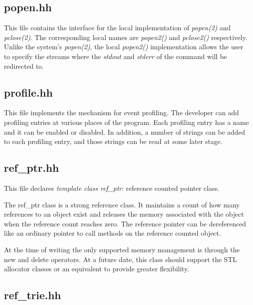 \documentclass[11pt]{article}
\begin{document}
\subsection{popen.hh}

This file contains the interface for the local implementation
of \emph{popen(2)} and \emph{pclose(2)}.
The corresponding local names are \emph{popen2()} and \emph{pclose2()}
respectively. Unlike the system's \emph{popen(2)}, the local
\emph{popen2()} implementation allows the user to specify the streams
where the \emph{stdout} and \emph{stderr} of the command will be
redirected to.

\subsection{profile.hh}

This file implements the mechanism for event profiling.
The developer can add profiling entries at various places of the program.
Each profiling entry has a name and it can be enabled or disabled.
In addition, a number of strings can be added to each profiling entry,
and those strings can be read at some later stage.


\subsection{ref\_ptr.hh}

This file declares \emph{template class ref\_ptr}: reference counted
pointer class.

The ref\_ptr class is a strong reference class.  It maintains a count of
how many references to an object exist and releases the memory associated
with the object when the reference count reaches zero.  The reference
pointer can be dereferenced like an ordinary pointer to call methods
on the reference counted object.

At the time of writing the only supported memory management is
through the new and delete operators.  At a future date, this class
should support the STL allocator classes or an equivalent to
provide greater flexibility.

\subsection{ref\_trie.hh}
\end{document}
